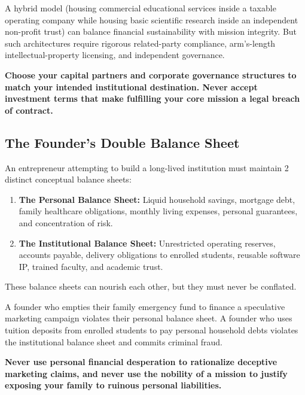 A hybrid model (housing commercial educational services inside a taxable operating company while housing basic scientific research inside an independent non-profit trust) can balance financial sustainability with mission integrity. But such architectures require rigorous related-party compliance, arm's-length intellectual-property licensing, and independent governance.

\textbf{Choose your capital partners and corporate governance structures to match your intended institutional destination. Never accept investment terms that make fulfilling your core mission a legal breach of contract.}

\subsection{The Founder's Double Balance Sheet}

An entrepreneur attempting to build a long-lived institution must maintain 2 distinct conceptual balance sheets:

\begin{enumerate}[leftmargin=12pt,itemsep=2.5pt,topsep=1pt,parsep=0pt]
  \item \textbf{The Personal Balance Sheet:} Liquid household savings, mortgage debt, family healthcare obligations, monthly living expenses, personal guarantees, and concentration of risk.
  \item \textbf{The Institutional Balance Sheet:} Unrestricted operating reserves, accounts payable, delivery obligations to enrolled students, reusable software IP, trained faculty, and academic trust.
\end{enumerate}

These balance sheets can nourish each other, but they must never be conflated.

A founder who empties their family emergency fund to finance a speculative marketing campaign violates their personal balance sheet. A founder who uses tuition deposits from enrolled students to pay personal household debts violates the institutional balance sheet and commits criminal fraud.

\textbf{Never use personal financial desperation to rationalize deceptive marketing claims, and never use the nobility of a mission to justify exposing your family to ruinous personal liabilities.}

